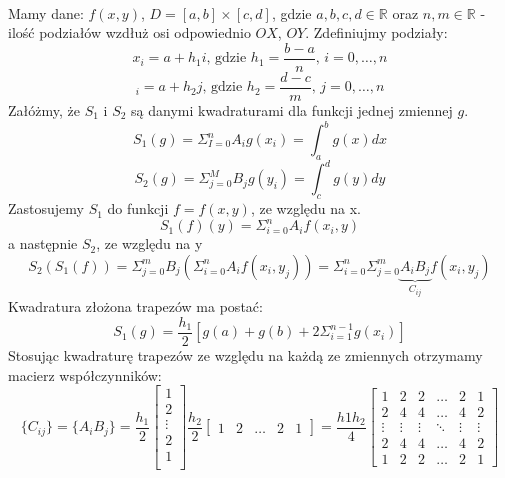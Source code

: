 \documentclass{article}
\begin{document}
\paragraph{}
Mamy dane: $f(x,y)$, $D = [a,b]\times[c,d]$, gdzie $a,b,c,d\in\mathbb{R}$ oraz $n,m\in\mathbb{R}$ - ilość podziałów wzdłuż osi odpowiednio $OX$, $OY$. Zdefiniujmy podziały:
$$x_i=a+h_1i\text{, gdzie }h_1=\dfrac{b-a}{n}\text{, }i=0,\dots,n$$
$$_i=a+h_2j\text{, gdzie }h_2=\dfrac{d-c}{m}\text{, }j=0,\dots,n$$
Załóżmy, że $S_1$ i $S_2$ są danymi kwadraturami dla funkcji jednej zmiennej $g$.\\
$$S_1(g) = \Sigma_{I=0}^{n}A_ig(x_i)=\int_a^bg(x)dx$$
$$S_2(g) = \Sigma_{j=0}^{M}B_jg(y_i)=\int_c^dg(y)dy$$
Zastosujemy $S_1$ do funkcji $f=f(x,y)$, ze względu na x.
$$S_1(f)(y)=\Sigma_{i=0}^nA_if(x_i,y)$$
a następnie $S_2$, ze względu na y
$$S_2(S_1(f))=\Sigma_{j=0}^mB_j(\Sigma_{i=0}^nA_if(x_i,y_j))=\Sigma_{i=0}^n\Sigma_{j=0}^m\underbrace{A_iB_j}_{C_{ij}}f(x_i,y_j)$$
Kwadratura złożona trapezów ma postać:
$$S_1(g)=\frac{h_1}{2}[g(a)+g(b)+2\Sigma_{i=1}^{n-1}g(x_i)]$$
Stosując kwadraturę trapezów ze względu na każdą ze zmiennych otrzymamy macierz współczynników:
$$\{C_{ij}\}=\{A_iB_j\}=\frac{h_1}{2}
\begin{bmatrix}
1\\
2\\
\vdots\\
2\\
1\\
\end{bmatrix}
\frac{h_2}{2}
\begin{bmatrix}
1 & 2 & \dots & 2 & 1
\end{bmatrix}=\frac{h1h_2}{4}
\begin{bmatrix}
1 & 2 & 2 & \dots & 2 & 1\\
2 & 4 & 4 & \dots & 4 & 2\\
\vdots & \vdots & \vdots & \ddots & \vdots & \vdots\\
2 & 4 & 4 & \dots & 4 & 2\\
1 & 2 & 2 & \dots & 2 & 1
\end{bmatrix}$$
\end{document}
